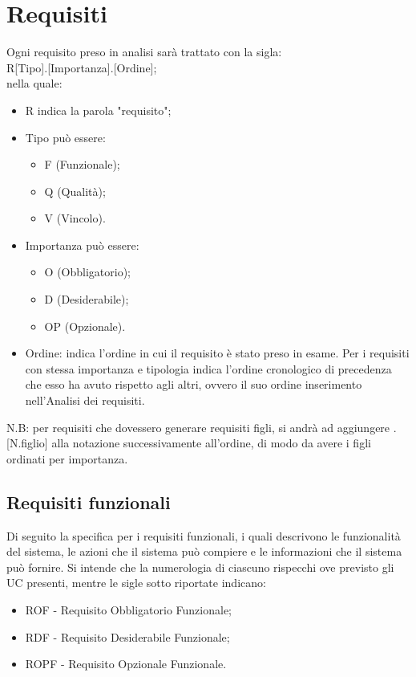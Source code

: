 \documentclass[10pt, a4paper]{article}
\begin{document}


\newpage
\section{Requisiti}
Ogni requisito preso in analisi sarà trattato con la sigla:\\
R[Tipo].[Importanza].[Ordine];\\
nella quale:\\
\begin{itemize}
\item R indica la parola "requisito";
\item Tipo può essere:
    \begin{itemize}
	\item F (Funzionale);
	\item Q (Qualità);
	\item V (Vincolo).
    \end{itemize}
\item Importanza può essere:
    \begin{itemize}
        \item O (Obbligatorio);
	\item D (Desiderabile);
	\item OP (Opzionale).
    \end{itemize}
\item Ordine: indica l’ordine in cui il requisito è stato preso in esame. Per i requisiti con stessa importanza e tipologia indica l’ordine cronologico di precedenza che esso ha avuto rispetto agli altri, ovvero il suo ordine inserimento nell'Analisi dei requisiti.
\end{itemize}
N.B: per requisiti che dovessero generare requisiti figli, si andrà ad aggiungere .[N.figlio] alla notazione successivamente all’ordine, di modo da avere i figli ordinati per importanza.

\subsection{Requisiti funzionali}
Di seguito la specifica per i requisiti funzionali, i quali descrivono le funzionalità del sistema, le azioni
che il sistema può compiere e le informazioni che il sistema può fornire.
Si intende che la numerologia di ciascuno rispecchi ove previsto gli UC presenti, mentre le sigle sotto
riportate indicano:
\begin{itemize}
    \item ROF - Requisito Obbligatorio Funzionale;
    \item RDF - Requisito Desiderabile Funzionale;
    \item ROPF - Requisito Opzionale Funzionale.
\end{itemize}
\end{document}
